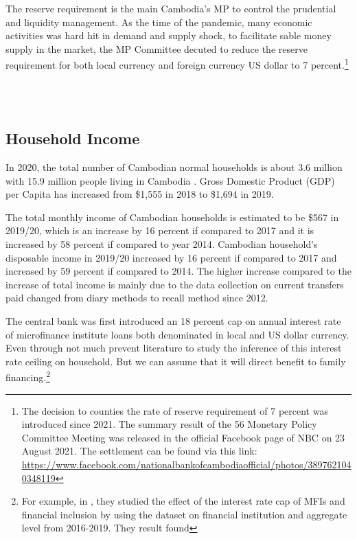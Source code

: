 \documentclass[11pt,letterpaper]{article}
\begin{document}
The reserve requirement is the main Cambodia's MP to control the prudential and liquidity management. As the time of the pandemic, many economic activities was hard hit in demand and supply shock, to facilitate sable money supply in the market, the MP Committee decuted  to reduce the reserve requirement for both local currency and foreign currency US dollar to 7 percent.\footnote{The decision to counties the rate of reserve requirement of 7 percent was introduced since 2021. The summary result of the 56 Monetary Policy Committee Meeting was released in the official Facebook page of NBC on 23 August 2021. The settlement can be found via this link: \url{https://www.facebook.com/nationalbankofcambodiaofficial/photos/3897621040348119}} 

\\


\\




\subsection{Household Income}
In 2020, the total number of Cambodian normal households is about 3.6 million with 15.9 million people living in Cambodia \cite{NIS2020}. Gross Domestic Product (GDP) per Capita has increased from \$1,555 in 2018 to \$1,694 in 2019. 

The total monthly income of Cambodian households is estimated to be \$567 in 2019/20, which is an increase by 16 percent if compared to 2017 and it is increased by 58 percent if compared to year 2014. Cambodian household’s disposable income in 2019/20 increased by 16 percent if compared to 2017 and increased by 59 percent if compared to 2014. The higher increase compared to the increase of total income is mainly due to the data collection on current transfers paid changed from diary methods to recall method since 2012.


The central bank was first introduced an 18 percent cap on annual interest rate of microfinance institute loans both denominated in local and US dollar currency. Even through not much prevent literature to study the inference of this interest rate ceiling on household. But we can assume that it will direct benefit to family financing.\footnote{For example, in \citet{Heng2021}, they studied the effect of the interest rate cap of MFIs and financial inclusion by using the dataset on financial institution and aggregate level from 2016-2019. They result found}  
\end{document}
